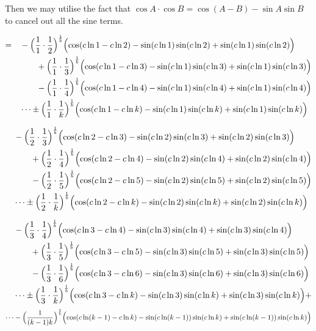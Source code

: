 \documentclass{amsart}
\begin{document}
	\[\]
	Then we may utilise the fact that $ \cos{A} \cdot \cos{B} = \cos{(A-B)} - \sin{A}\sin{B} $ to cancel out all the sine terms.
	
	\[
	\begin{aligned}
		= \quad & -\Bigl( \frac{1}{1} \cdot \frac{1}{2} \Bigr)^\frac1b \Bigl( \cos(c \ln1 - c \ln 2) - \sin(c \ln1) \sin(c \ln2) + \sin(c \ln1) \sin(c \ln2) \Bigr) \\
		& \qquad +\Bigl( \frac{1}{1} \cdot \frac{1}{3} \Bigr)^\frac1b \Bigl( \cos(c \ln1 - c \ln3) - \sin(c \ln1) \sin(c \ln3) + \sin(c \ln1) \sin(c \ln3) \Bigr) \\
		& \qquad -\Bigl( \frac{1}{1} \cdot \frac{1}{4} \Bigr)^\frac1b \Bigl( \cos(c \ln1 - c \ln4) - \sin(c \ln1) \sin(c \ln4) + \sin(c \ln1) \sin(c \ln4) \Bigr) \\
		& \dots  \pm \Bigl( \frac{1}{1} \cdot \frac{1}{k} \Bigr)^\frac1b \Bigl( \cos(c \ln1 - c \ln k) - \sin(c \ln1) \sin(c \ln k) + \sin(c \ln1) \sin(c \ln k) \Bigr)
	\end{aligned}
	\]
	
	\[
	\begin{aligned}
		\quad & -\Bigl( \frac{1}{2} \cdot \frac{1}{3} \Bigr)^\frac1b \Bigl( \cos(c \ln2 - c \ln3) - \sin(c \ln2) \sin(c \ln3) + \sin(c \ln2) \sin(c \ln3) \Bigr) \\
		& \qquad +\Bigl( \frac{1}{2} \cdot \frac{1}{4} \Bigr)^\frac1b \Bigl( \cos(c \ln2 - c \ln4) - \sin(c \ln2) \sin(c \ln4) + \sin(c \ln2) \sin(c \ln4) \Bigr) \\
		& \qquad -\Bigl( \frac{1}{2} \cdot \frac{1}{5} \Bigr)^\frac1b \Bigl( \cos(c \ln2 - c \ln5) - \sin(c \ln2) \sin(c \ln5) + \sin(c \ln2) \sin(c \ln5) \Bigr) \\
		& \dots  \pm \Bigl( \frac{1}{2} \cdot \frac{1}{k} \Bigr)^\frac1b \Bigl( \cos(c \ln2 - c \ln k) - \sin(c \ln2) \sin(c \ln k) + \sin(c \ln2) \sin(c \ln k) \Bigr) 
	\end{aligned}
	\]
	
	\[
	\begin{aligned}
		\quad & -\Bigl( \frac{1}{3} \cdot \frac{1}{4} \Bigr)^\frac1b \Bigl( \cos(c \ln3 - c \ln4) - \sin(c \ln3) \sin(c \ln4) + \sin(c \ln3) \sin(c \ln4) \Bigr) \\
		& \qquad +\Bigl( \frac{1}{3} \cdot \frac{1}{5} \Bigr)^\frac1b \Bigl( \cos(c \ln3 - c \ln5) - \sin(c \ln3) \sin(c \ln5) + \sin(c \ln3) \sin(c \ln5) \Bigr) \\
		& \qquad -\Bigl( \frac{1}{3} \cdot \frac{1}{6} \Bigr)^\frac1b \Bigl( \cos(c \ln3 - c \ln6) - \sin(c \ln3) \sin(c \ln6) + \sin(c \ln3) \sin(c \ln6) \Bigr) \\
		& \dots \pm \Bigl( \frac{1}{3} \cdot \frac{1}{k} \Bigr)^\frac1b \Bigl( \cos(c \ln3 - c \ln k) - \sin(c \ln3) \sin(c \ln k) + \sin(c \ln3) \sin(c \ln k) \Bigr) + 
	\end{aligned}
	\]
	\[ \dots - \Bigl( \frac{1}{(k-1)k} \Bigr)^\frac1b \Bigl( \cos(c \ln (k-1) - c \ln k) - \sin(c \ln (k-1)) \sin(c \ln k) + \sin(c \ln (k-1)) \sin(c \ln k) \Bigr) \]
	
\end{document}
